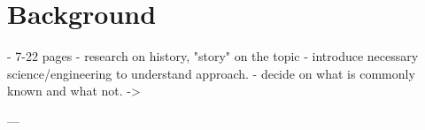 \chapter{Background}

- 7-22 pages
- research on history, "story" on the topic
- introduce necessary science/engineering to understand approach.
  - decide on what is commonly known and what not. -> %

---

